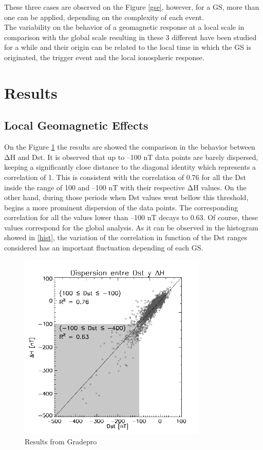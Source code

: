 \documentclass[a4paper, 11pt]{article}
\begin{document}
These three cases are observed on the Figure \ref{gse}, however, for a GS, more than one can be applied, depending on the complexity of each event.\\   

The variability on the behavior of a geomagnetic response at a local scale in comparison with the global scale resulting in these 3 different have been studied for a while and their origin can be related to the local time in which the GS is originated, the trigger event and the local ionospheric response.

\section{Results}


\subsection{Local Geomagnetic Effects}

On the Figure \ref{dispersion} the results are showed the comparison in the behavior between $\mathrm{\Delta H}$ and Dst. It is observed that up to –100 nT data points are barely dispersed, keeping a significantly close distance to the diagonal identity which represents a correlation of 1. This is consistent with the correlation of 0.76 for all the Dst inside the range of 100 and –100 nT with their respective $\mathrm{\Delta H}$ values.  On the other hand, during those periods when Dst values went bellow this threshold, begins a more prominent dispersion of the data points. The corresponding correlation for all the values lower than –100 nT decays to 0.63. Of course, these values correspond for the global analysis. As it can be observed in the histogram showed in \ref{hist}, the variation of the correlation in function of the Dst ranges considered has an important fluctuation depending of each GS. \\ 

\begin{figure}
\centering
\includegraphics[width=0.8\textwidth]{dispersion_plot.png}
\caption{\label{dispersion}Results from Gradepro}
\end{figure}
\end{document}

